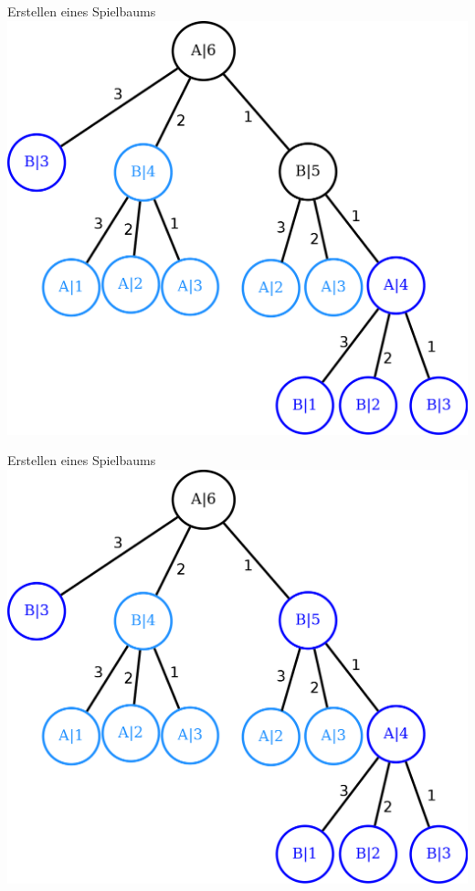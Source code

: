 \documentclass[18pt]{beamer}
\begin{document}
\begin{frame}{Erstellen eines Spielbaums}
\includegraphics[scale=0.4]{baum16.png}
\end{frame}

\begin{frame}{Erstellen eines Spielbaums}
\includegraphics[scale=0.4]{baum17.png}
\end{frame}
\end{document}
